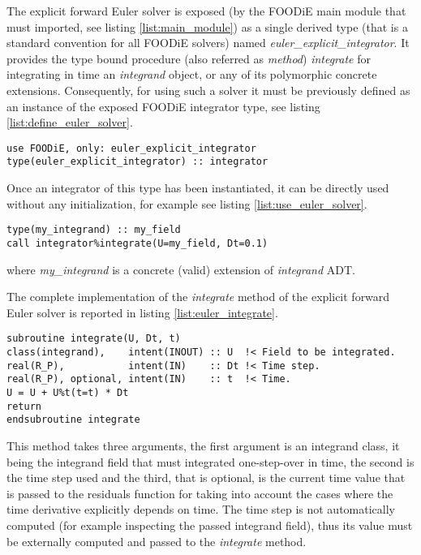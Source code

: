 \documentclass[pdftex,preprint,3p,times,numbers]{elsarticle}
\begin{document}
The explicit forward Euler solver is exposed (by the FOODiE main module that must imported, see listing \ref{list:main_module}) as a single derived type (that is a standard convention for all FOODiE solvers) named \emph{euler\_explicit\_integrator}. It provides the type bound procedure (also referred as \emph{method}) \emph{integrate} for integrating in time an \emph{integrand} object, or any of its polymorphic concrete extensions. Consequently, for using such a solver it must be previously defined as an instance of the exposed FOODiE integrator type, see listing \ref{list:define_euler_solver}.

\begin{lstlisting}[firstnumber=1,style=code,caption={definition of an explicit forward Euler integrator},label={list:define_euler_solver}]
use FOODiE, only: euler_explicit_integrator
type(euler_explicit_integrator) :: integrator
\end{lstlisting}

Once an integrator of this type has been instantiated, it can be directly used without any initialization, for example see listing \ref{list:use_euler_solver}.

\begin{lstlisting}[firstnumber=1,style=code,caption={example of usage of an explicit forward Euler integrator},label={list:use_euler_solver}]
type(my_integrand) :: my_field
call integrator%integrate(U=my_field, Dt=0.1)
\end{lstlisting}
where \emph{my\_integrand} is a concrete (valid) extension of \emph{integrand} ADT.

The complete implementation of the \emph{integrate} method of the explicit forward Euler solver is reported in listing \ref{list:euler_integrate}.

\begin{lstlisting}[firstnumber=1,style=code,caption={implementation of the \emph{integrate} method of Euler solver},label={list:euler_integrate}]
subroutine integrate(U, Dt, t)
class(integrand),    intent(INOUT) :: U  !< Field to be integrated.
real(R_P),           intent(IN)    :: Dt !< Time step.
real(R_P), optional, intent(IN)    :: t  !< Time.
U = U + U%t(t=t) * Dt
return
endsubroutine integrate
\end{lstlisting}
This method takes three arguments, the first argument is an integrand class, it being the integrand field that must integrated one-step-over in time, the second is the time step used and the third, that is optional, is the current time value that is passed to the residuals function for taking into account the cases where the time derivative explicitly depends on time. The time step is not automatically computed (for example inspecting the passed integrand field), thus its value must be externally computed and passed to the \emph{integrate} method.
\end{document}
